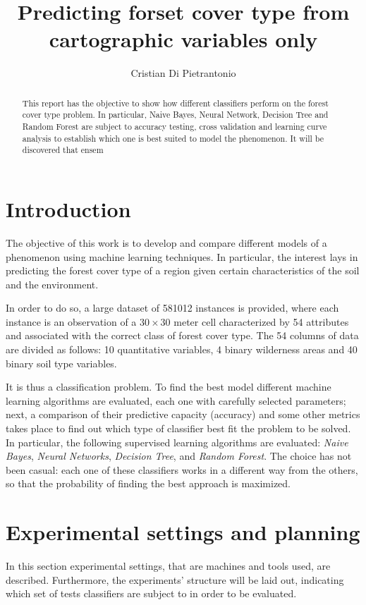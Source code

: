 \documentclass[a4paper, 10pt]{article}
\title{Predicting forset cover type from cartographic variables only}
\author{Cristian Di Pietrantonio}
\begin{document}
\maketitle
\begin{abstract}
This report has the objective to show how different classifiers perform on the forest cover type problem. In particular, Naive Bayes, Neural Network, Decision Tree and Random Forest are subject to accuracy testing, cross validation and learning curve analysis to establish which one is best suited to model the phenomenon. It will be discovered that ensem
\end{abstract}
\newpage
\tableofcontents
\newpage

\section{Introduction}

The objective of this work is to develop and compare different models of a phenomenon using machine learning techniques. In particular, the interest lays in predicting the forest cover type of a region given certain characteristics of the soil and the environment.

In order to do so, a large dataset of 581012 instances is provided, where each instance is an observation of a $30 \times 30$ meter cell characterized by 54 attributes and associated with the correct class of forest cover type. The 54 columns of data are divided as follows: 10 quantitative variables, 4 binary wilderness areas and 40 binary soil type variables.

It is thus a classification problem. To find the best model different machine learning algorithms are evaluated, each one with carefully selected parameters; next, a comparison of their predictive capacity (accuracy) and some other metrics takes place to find out which type of classifier best fit the problem to be solved. In particular, the following supervised learning algorithms are evaluated: \emph{Naive Bayes}, \emph{Neural Networks}, \emph{Decision Tree}, and \emph{Random Forest}. The choice has not been casual: each one of these classifiers works in a different way from the others, so that the probability of finding the best approach is maximized.

\section{Experimental settings and planning} 
In this section experimental settings, that are machines and tools used, are described. Furthermore, the experiments' structure will be laid out, indicating which set of tests classifiers are subject to in order to be evaluated.
\end{document}
